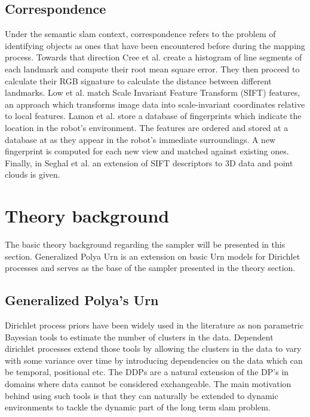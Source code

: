 \documentclass[]{article}
\begin{document}
\subsection{Correspondence}

Under the semantic slam context, correspondence refers to the problem of identifying objects as ones that have been encountered before during the mapping process. Towards that direction Cree et al.\cite{corresp:first} create a histogram of line segments of each landmark and compute their root mean square error. They then proceed to calculate their RGB signature to calculate the distance between different landmarks. Low et al.\cite{corres:sec} match Scale Invariant Feature Transform (SIFT) features, an approach which transforms image data into scale-invariant coordinates relative to local features. Lamon et al.\cite{corres:three} store a database of fingerprints which indicate the location in the robot's environment. The features are ordered and stored at a database at as they appear in the robot's immediate surroundings. A new fingerprint is computed for each new view and matched against existing ones. Finally, in Seghal et al.\cite{corres:four} an extension of SIFT descriptors to 3D data and point clouds is given.

\section{Theory background}
\label{sec:theory}

The basic theory background regarding the sampler will be presented in this section. Generalized Polya Urn is an extension on basic Urn\cite{caron} models for Dirichlet processes and serves as the base of the sampler presented in the theory section.

\subsection{Generalized Polya's Urn}

Dirichlet process priors have been widely used in the literature as non parametric Bayesian tools to estimate the number of clusters in the data\cite{antoniak}. Dependent dirichlet processes extend those tools by allowing the clusters in the data to vary with some variance over time by introducing dependencies on the data which can be temporal, positional etc. The DDPs are a natural extension of the DP's in domains where data cannot be considered exchangeable. The main motivation behind using such tools is that they can naturally be extended to dynamic environments to tackle the dynamic part of the long term slam problem.
\end{document}
